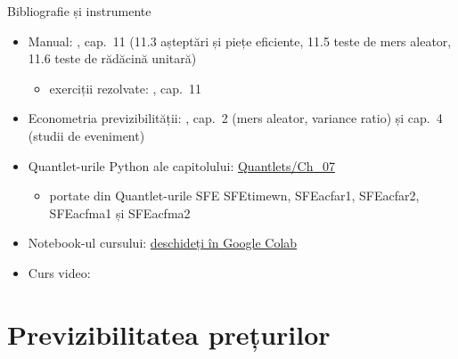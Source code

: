 \begin{frame}{Bibliografie și instrumente}
\itemsize{\small}
\begin{itemize}
    \item Manual: , cap.~11 (11.3 așteptări și piețe eficiente, 11.5 teste de mers aleator, 11.6 teste de rădăcină unitară)
    \begin{itemize}
        \item exerciții rezolvate: , cap.~11
    \end{itemize}
    \item Econometria previzibilității: , cap.~2 (mers aleator, variance ratio) și cap.~4 (studii de eveniment)
    \item Quantlet-urile Python ale capitolului: \href{https://github.com/danpele/SFM/tree/main/Quantlets/Ch_07}{Quantlets/Ch\_07}
    \begin{itemize}
        \item portate din Quantlet-urile SFE SFEtimewn, SFEacfar1, SFEacfar2, SFEacfma1 și SFEacfma2
    \end{itemize}
    \item Notebook-ul cursului: \href{\colaburl{notebooks/EN/chapter7_lecture_notebook.ipynb}}{deschideți în Google Colab}
    \item Curs video: 
\end{itemize}
\end{frame}


\section{Previzibilitatea prețurilor}

